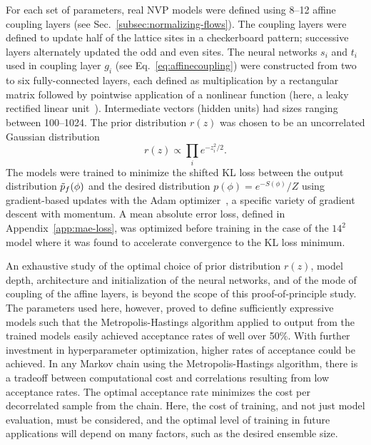 For each set of parameters, real NVP models were defined using 8--12 affine coupling layers (see Sec.~\ref{subsec:normalizing-flows}). The coupling layers were defined to update half of the lattice sites in a checkerboard pattern; successive layers alternately updated the odd and even sites. The neural networks $s_i$ and $t_i$ used in coupling layer $g_i$ (see Eq.~\eqref{eq:affinecoupling}) were constructed from two to six fully-connected layers, each defined as multiplication by a rectangular matrix followed by pointwise application of a nonlinear function (here, a leaky rectified linear unit~\cite{Nair2010}). Intermediate vectors (hidden units) had sizes ranging between 100--1024. The prior distribution $r(z)$ was chosen to be an uncorrelated Gaussian distribution
\begin{equation}
    r(z) \propto \prod_i e^{-z_i^2 / 2}.
\end{equation}
The models were trained to minimize the shifted KL loss between the output distribution $\tilde{p}_f(\phi)$ and the desired distribution $p(\phi) = e^{-S(\phi)}/Z$ using gradient-based updates with the Adam optimizer~\cite{Kingma2015Adam}, a specific variety of gradient descent with momentum. A mean absolute error loss, defined in Appendix~\ref{app:mae-loss}, was optimized before training in the case of the $14^2$ model where it was found to accelerate convergence to the KL loss minimum.

An exhaustive study of the optimal choice of prior distribution $r(z)$, model depth, architecture and initialization of the neural networks, and of the mode of coupling of the affine layers, is beyond the scope of this proof-of-principle study. The parameters used here, however, proved to define sufficiently expressive models such that the Metropolis-Hastings algorithm applied to output from the trained models easily achieved acceptance rates of well over 50\%.
%
With further investment in hyperparameter optimization, higher rates of acceptance could be achieved. In any Markov chain using the Metropolis-Hastings algorithm, there is a tradeoff between computational cost and correlations resulting from low acceptance rates. The optimal acceptance rate minimizes the cost per decorrelated sample from the chain. Here, the cost of training, and not just model evaluation, must be considered, and the optimal level of training in future applications will depend on many factors, such as the desired ensemble size.


